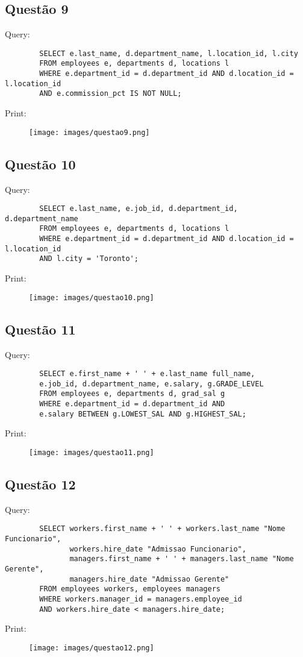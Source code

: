 \documentclass{article}[twocolumn]
\begin{document}
	\subsection{Quest\~ao 9}
	Query:
	\begin{verbatim}
		SELECT e.last_name, d.department_name, l.location_id, l.city
		FROM employees e, departments d, locations l
		WHERE e.department_id = d.department_id AND d.location_id = l.location_id
		AND e.commission_pct IS NOT NULL;
	\end{verbatim}
	Print:
	\begin{figure}[H]
		\centering
		\texttt{[image: images/questao9.png]}
	\end{figure}
	\newpage
	\subsection{Quest\~ao 10}
	Query:
	\begin{verbatim}
		SELECT e.last_name, e.job_id, d.department_id, d.department_name
		FROM employees e, departments d, locations l
		WHERE e.department_id = d.department_id AND d.location_id = l.location_id
		AND l.city = 'Toronto';
	\end{verbatim}
	Print:
	\begin{figure}[H]
		\centering
		\texttt{[image: images/questao10.png]}
	\end{figure}
	\newpage
	\subsection{Quest\~ao 11}
	Query:
	\begin{verbatim}
		SELECT e.first_name + ' ' + e.last_name full_name,
		e.job_id, d.department_name, e.salary, g.GRADE_LEVEL
		FROM employees e, departments d, grad_sal g
		WHERE e.department_id = d.department_id AND
		e.salary BETWEEN g.LOWEST_SAL AND g.HIGHEST_SAL;
	\end{verbatim}
	Print:
	\begin{figure}[H]
		\centering
		\texttt{[image: images/questao11.png]}
	\end{figure}
	\newpage
	\subsection{Quest\~ao 12}
	Query:
	\begin{verbatim}
		SELECT workers.first_name + ' ' + workers.last_name "Nome Funcionario",
		       workers.hire_date "Admissao Funcionario",
		       managers.first_name + ' ' + managers.last_name "Nome Gerente",
		       managers.hire_date "Admissao Gerente"
		FROM employees workers, employees managers
		WHERE workers.manager_id = managers.employee_id
		AND workers.hire_date < managers.hire_date;
	\end{verbatim}
	Print:
	\begin{figure}[H]
		\centering
		\texttt{[image: images/questao12.png]}
	\end{figure}
	\newpage
\end{document}
